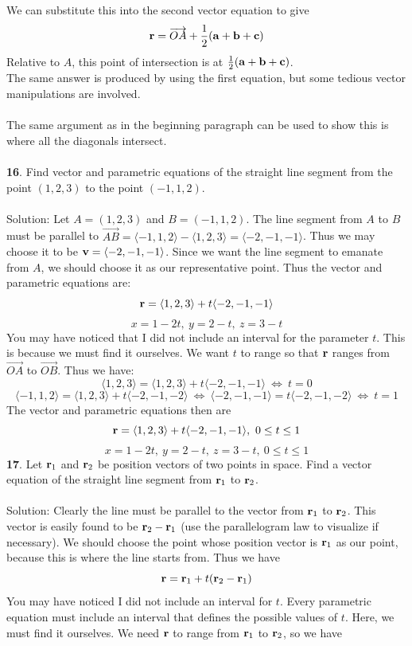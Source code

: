 \documentclass[12pt]{amsbook}
\newcommand{\la}{\langle}
\newcommand{\ra}{\rangle}
\begin{document}
We can substitute this into the second vector equation to give
$${\bf r}=\overrightarrow{OA}+\frac{1}{2}({\bf a}+{\bf b}+{\bf c})$$
Relative to $A$, this point of intersection is at $\frac{1}{2}({\bf a}+{\bf b}+{\bf c})$.
\\
The same answer is produced by using the first equation, but some tedious vector manipulations are involved.
\\
\\
The same argument as in the beginning paragraph can be used to show this is where all the diagonals intersect.
\\
\\
{\small\bf 16}. Find vector and parametric equations of the straight line segment
from the point $(1,2,3)$ to the point $(-1,1,2)$.\\
\\
{\sc Solution}: Let $A=(1,2,3)$ and $B=(-1,1,2)$. The line segment from $A$ to $B$ must be parallel to $\overrightarrow{AB}=\la -1,1,2 \ra - \la 1,2,3 \ra = \la -2, -1, -1 \ra$. Thus we may choose it to be ${\bf v}=\la -2,-1,-1 \ra$. Since we want the line segment to emanate from $A$, we should choose it as our representative point. Thus the vector and parametric equations are:
 $${\bf r} = \la 1,2,3\ra +t\la -2,-1,-1\ra$$
 $$x=1-2t, \ y=2-t, \ z=3-t$$
 You may have noticed that I did not include an interval for the parameter $t$. This is because we must find it ourselves. We want $t$ to range so that ${\bf r}$ ranges from $\overrightarrow{OA}$ to $\overrightarrow{OB}$. Thus we have:
 $$\la 1,2,3 \ra = \la 1,2,3\ra +t\la -2,-1,-1\ra \ \Leftrightarrow \ t=0$$
 $$\la -1,1,2 \ra = \la 1,2,3 \ra +t \la -2,-1,-2 \ra \ \Leftrightarrow \ \la -2,-1,-1 \ra =t\la -2,-1,-2 \ra \ \Leftrightarrow \ t=1$$
 The vector and parametric equations then are
  $${\bf r} = \la 1,2,3\ra +t\la -2,-1,-1\ra, \ 0 \leq t\leq 1$$
 $$x=1-2t, \ y=2-t, \ z=3-t, \ 0 \leq t\leq 1$$
{\small\bf 17}. Let ${\bf r}_1$ and ${\bf r}_2$ be position vectors of
two points in space.  Find a vector equation of the straight
line segment from ${\bf r}_1$ to ${\bf r}_2$.\\
\\
{\sc Solution}: Clearly the line must be parallel to the vector from ${\bf r}_1$ to ${\bf r}_2$. This vector is easily found to be ${\bf r}_2-{\bf r}_1$ (use the parallelogram law to visualize if necessary). We should choose the point whose position vector is ${\bf r}_1$ as our point, because this is where the line starts from. Thus we have
$${\bf r}={\bf r}_1+t({\bf r}_2-{\bf r}_1)$$
You may have noticed I did not include an interval for $t$. Every parametric equation must include an interval that defines the possible values of $t$. Here, we must find it ourselves. We need $\bf r$ to range from ${\bf r}_1$ to ${\bf r}_2$, so we have
\end{document}
